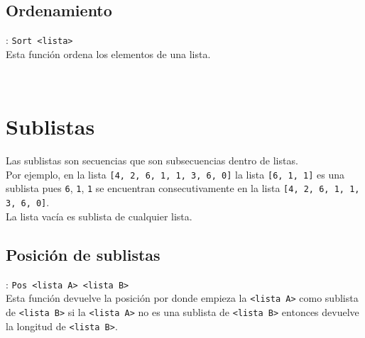       \subsection*{Ordenamiento}: \texttt{Sort <lista>}\\
      Esta función ordena los elementos de una lista.
      
      \begin{fxcode}
         \\
         \outcode{[0, 1, 1, 2, 3, 4, 6, 6]}
      \end{fxcode}
      
   \section{Sublistas}
      Las sublistas son secuencias que son subsecuencias dentro de listas.
      \\
      
      Por ejemplo, en la lista \texttt{[4, 2, 6, 1, 1, 3, 6, 0]} la lista \texttt{[6, 1, 1]} es una sublista pues \texttt{6}, \texttt{1}, \texttt{1} se encuentran consecutivamente en la lista \texttt{[4, 2, 6, 1, 1, 3, 6, 0]}.
      \\
      
      La lista vacía es sublista de cualquier lista.
      
      \subsection*{Posición de sublistas}: \texttt{Pos <lista A>~<lista B>}\\
      Esta función devuelve la posición por donde empieza la \texttt{<lista A>} como sublista de \texttt{<lista B>} si la \texttt{<lista A>} no es una sublista de \texttt{<lista B>} entonces devuelve la longitud de \texttt{<lista B>}.
      
      \begin{fxcode}
         \\
         \\
         \\
         \\
         \\
      \end{fxcode}
      
